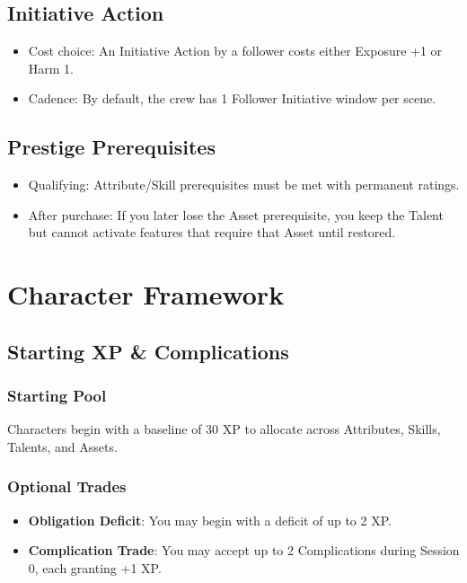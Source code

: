 \documentclass[11pt]{article}
\begin{document}
\subsection{Initiative Action}
\begin{itemize}
    \item Cost choice: An Initiative Action by a follower costs either Exposure +1 or Harm 1.
    \item Cadence: By default, the crew has 1 Follower Initiative window per scene.
\end{itemize}

\subsection{Prestige Prerequisites}
\begin{itemize}
    \item Qualifying: Attribute/Skill prerequisites must be met with permanent ratings.
    \item After purchase: If you later lose the Asset prerequisite, you keep the Talent but cannot activate features that require that Asset until restored.
\end{itemize}

\section{Character Framework}

\subsection{Starting XP \& Complications}

\subsubsection{Starting Pool}
Characters begin with a baseline of 30 XP to allocate across Attributes, Skills, Talents, and Assets.

\subsubsection{Optional Trades}
\begin{itemize}
    \item \textbf{Obligation Deficit}: You may begin with a deficit of up to 2 XP.
    \item \textbf{Complication Trade}: You may accept up to 2 Complications during Session 0, each granting +1 XP.
\end{itemize}
\end{document}
